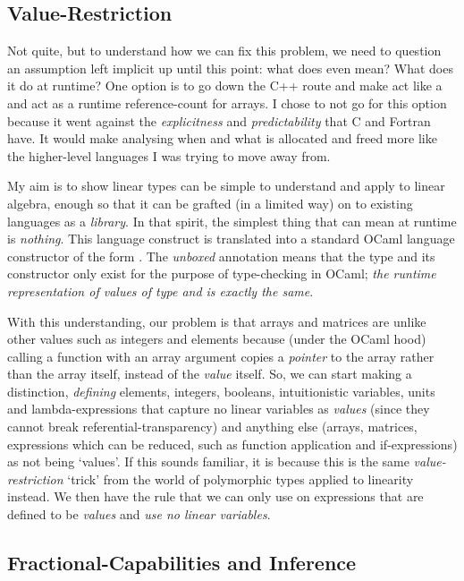 \subsection{Value-Restriction}

Not quite, but to understand how we can fix this problem, we need to question
an assumption left implicit up until this point: what does  even
mean? What does it do at runtime? One option is to go down the C++ route and
make  act like a  and act as a runtime
reference-count for arrays. I chose to not go for this option because it went
against the \emph{explicitness} and \emph{predictability} that C and Fortran
have. It would make analysing when and what is allocated and freed more like
the higher-level languages I was trying to move away from.

My aim is to show linear types can be simple to understand and apply to linear
algebra, enough so that it can be grafted (in a limited way) on to existing
languages as a \emph{library}. In that spirit, the simplest thing that
 can mean at runtime is \emph{nothing}. This language construct is
translated into a standard OCaml language constructor of the form . The \emph{unboxed} annotation means
that the type and its constructor only exist for the purpose of type-checking
in OCaml; \emph{the runtime representation of values of type  and
 is exactly the same}.

With this understanding, our problem is that arrays and matrices are unlike
other values such as integers and elements because (under the OCaml hood)
calling a function with an array argument copies a \emph{pointer} to the array
rather than the array itself, instead of the \emph{value} itself. So, we can
start making a distinction, \emph{defining} elements, integers, booleans,
intuitionistic variables, units and lambda-expressions that capture no linear
variables as \emph{values} (since they cannot break referential-transparency)
and anything else (arrays, matrices, expressions which can be reduced, such as
function application and if-expressions) as not being `values'. If this sounds
familiar, it is because this is the same \emph{value-restriction} `trick' from
the world of polymorphic types applied to linearity instead. We then have the
rule that we can only use  on expressions that are defined to be
\emph{values} and \emph{use no linear variables}.

\subsection{Fractional-Capabilities and Inference}


